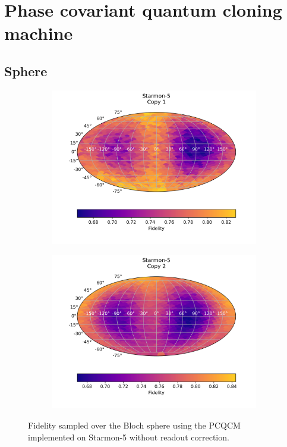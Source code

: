 \section{Phase covariant quantum cloning machine}
\subsection{Sphere}

\begin{figure}[H]
    \centering
    \begin{subfigure}{.5\textwidth}
      \centering
      \includegraphics[width=\textwidth]{Figures/PhaseCovariant/Starmon/FullSphere/results_starmon_copy1.png}
      \label{fig:pc_uncorrected_starmon_sphere_1}
    \end{subfigure}%
    \begin{subfigure}{.5\textwidth}
      \centering
      \includegraphics[width=\textwidth]{Figures/PhaseCovariant/Starmon/FullSphere/results_starmon_copy2.png}
      \label{fig:pc_uncorrected_starmon_sphere_2}
    \end{subfigure}
    \caption{Fidelity sampled over the Bloch sphere using the PCQCM implemented on Starmon-5 without readout correction.}
    \label{fig:pc_uncorrected_starmon_sphere}
  \end{figure}
  
